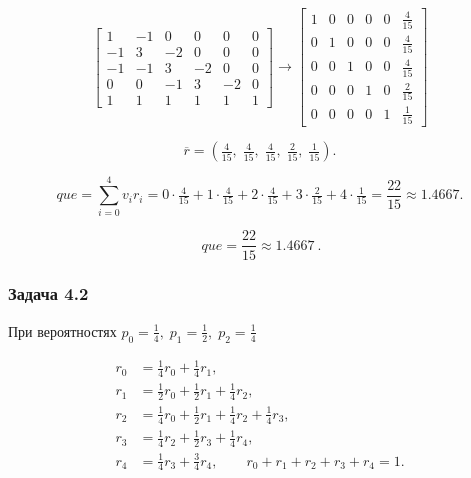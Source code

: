 \[
	\left[
		\begin{array}{rrrrr|r}
			1  & -1 & 0  & 0  & 0  & 0 \\
			-1 & 3  & -2 & 0  & 0  & 0 \\
			-1 & -1 & 3  & -2 & 0  & 0 \\
			0  & 0  & -1 & 3  & -2 & 0 \\
			1  & 1  & 1  & 1  & 1  & 1
		\end{array}
		\right]
	\overset{}{\longrightarrow}
	\left[
		\begin{array}{rrrrr|r}
			1 & 0 & 0 & 0 & 0 & \tfrac{4}{15} \\
			0 & 1 & 0 & 0 & 0 & \tfrac{4}{15} \\
			0 & 0 & 1 & 0 & 0 & \tfrac{4}{15} \\
			0 & 0 & 0 & 1 & 0 & \tfrac{2}{15} \\
			0 & 0 & 0 & 0 & 1 & \tfrac{1}{15}
		\end{array}
		\right]
\]

\[
	\overline r =
	\left(\tfrac{4}{15},\;\tfrac{4}{15},\;\tfrac{4}{15},\;\tfrac{2}{15},\;\tfrac{1}{15}\right).
\]

\[
	que = \sum_{i=0}^{4} v_i r_i= 0\cdot\tfrac{4}{15} + 1\cdot\tfrac{4}{15} + 2\cdot\tfrac{4}{15} + 3\cdot\tfrac{2}{15} + 4\cdot\tfrac{1}{15} = \frac{22}{15} \approx 1.4667.
\]

\[
	\boxed{\ que=\frac{22}{15}\approx1.4667\ }.
\]

\subsubsection*{Задача 4.2}

При вероятностях $p_0=\tfrac{1}{4},\; p_1=\tfrac{1}{2},\; p_2=\tfrac{1}{4}$

\[
	\begin{aligned}
		r_0 & = \tfrac{1}{4}r_0 + \tfrac{1}{4}r_1,                                     \\
		r_1 & = \tfrac{1}{2}r_0 + \tfrac{1}{2}r_1 + \tfrac{1}{4}r_2,                   \\
		r_2 & = \tfrac{1}{4}r_0 + \tfrac{1}{2}r_1 + \tfrac{1}{4}r_2 + \tfrac{1}{4}r_3, \\
		r_3 & = \tfrac{1}{4}r_2 + \tfrac{1}{2}r_3 + \tfrac{1}{4}r_4,                   \\
		r_4 & = \tfrac{1}{4}r_3 + \tfrac{3}{4}r_4,\qquad
		r_0+r_1+r_2+r_3+r_4=1.
	\end{aligned}
\]

